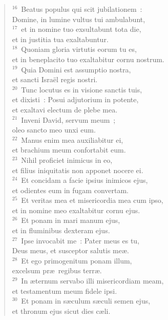 \begin{flushleft}
\begin{verse}
${}^{16}$~Beatus populus qui scit jubilationem~:\\ Domine, in lumine vultus tui ambulabunt,\\
${}^{17}$~et in nomine tuo exsultabunt tota die,\\ et in justitia tua exaltabuntur.\\
${}^{18}$~Quoniam gloria virtutis eorum tu es,\\ et in beneplacito tuo exaltabitur cornu nostrum.\\
${}^{19}$~Quia Domini est assumptio nostra,\\ et sancti Isra\"el regis nostri.\\
${}^{20}$~Tunc locutus es in visione sanctis tuis,\\ et dixisti~: Posui adjutorium in potente,\\ et exaltavi electum de plebe mea.\\
${}^{21}$~Inveni David, servum meum~;\\ oleo sancto meo unxi eum.\\
${}^{22}$~Manus enim mea auxiliabitur ei,\\ et brachium meum confortabit eum.\\
${}^{23}$~Nihil proficiet inimicus in eo,\\ et filius iniquitatis non apponet nocere ei.\\
${}^{24}$~Et concidam a facie ipsius inimicos ejus,\\ et odientes eum in fugam convertam.\\
${}^{25}$~Et veritas mea et misericordia mea cum ipso,\\ et in nomine meo exaltabitur cornu ejus.\\
${}^{26}$~Et ponam in mari manum ejus,\\ et in fluminibus dexteram ejus.\\
${}^{27}$~Ipse invocabit me~: Pater meus es tu,\\ Deus meus, et susceptor salutis me\ae .\\
${}^{28}$~Et ego primogenitum ponam illum,\\ excelsum pr\ae\ regibus terr\ae .\\
${}^{29}$~In \ae ternum servabo illi misericordiam meam,\\ et testamentum meum fidele ipsi.\\
${}^{30}$~Et ponam in s\ae culum s\ae culi semen ejus,\\ et thronum ejus sicut dies c\ae li.\\

\end{verse}
\end{flushleft}
